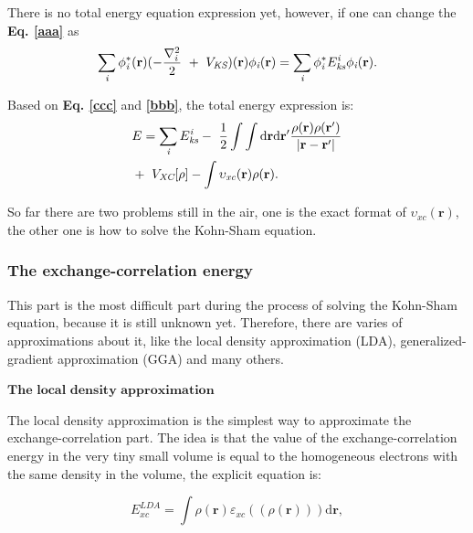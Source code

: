 \documentclass[a4paper, 12pt, titlepage,oneside,drop]{kthesis}
\begin{document}
There is no total energy equation expression yet, however, if one can change the \textbf{Eq. \ref{aaa}} as 
\begin{equation}\label{bbb}
\sumi<i> \phi^{*}_{\textit{i}}(\textbf{r})(-\frac{\nabla^{2}_{i}}{2}\ + \ V_\textit{KS})(\textbf{r}) \phi_{\textit{i}}(\textbf{r}) = \sumi<i> \phi^{*}_{\textit{i}}E_{\textit{ks}}^{\textit{i}} \phi_{\textit{i}}(\textbf{r}).
\end{equation}

Based on \textbf{Eq. \ref{ccc}} and \textbf{\ref{bbb}}, the total energy expression is:
\begin{equation}\label{totalenergy}
\begin{split}
& E= \sumi<i> E_{\textit{ks}}^{\textit{i}} - \ \frac{1}{2} \int \int \mathrm{d} {\textbf{r}} \mathrm{d}{\textbf{r}^{\prime}} \frac{\rho({\textbf{r}})\rho(\textbf{r}^{\prime})}{|{\textbf{r}}-{\textbf{r}}^{\prime}|} \\
&    + \ V_\textit{XC}[\rho] - \int   \upsilon_\textit{xc}(\textbf{r}) \rho({\textbf{r}}).
\end{split}
\end{equation}

So far there are two problems still in the air, one is the exact format of $\upsilon_\textit{xc}(\textbf{r})$, the other one is how to solve the Kohn-Sham equation.

\subsubsection{The exchange-correlation energy}

This part is the most difficult part during the process of solving the Kohn-Sham equation, because it is still unknown yet. Therefore, there
 are varies of approximations about it, like the local density approximation (LDA), generalized-gradient approximation (GGA) and many others.

$\textbf{The local density approximation}$

The local density approximation is the simplest way to approximate the exchange-correlation part. The idea is that the value 
of the exchange-correlation energy in the very tiny small volume is equal to the homogeneous electrons with the same density in 
the volume, the explicit equation is: 

\begin{equation}
 E^\textit{LDA}_\textit{xc} = \int \rho(\textbf{r}) \varepsilon_\textit{xc}( (\rho(\textbf{r})) ) \mathrm{d} \textbf{r}, 
\end{equation}
\end{document}
